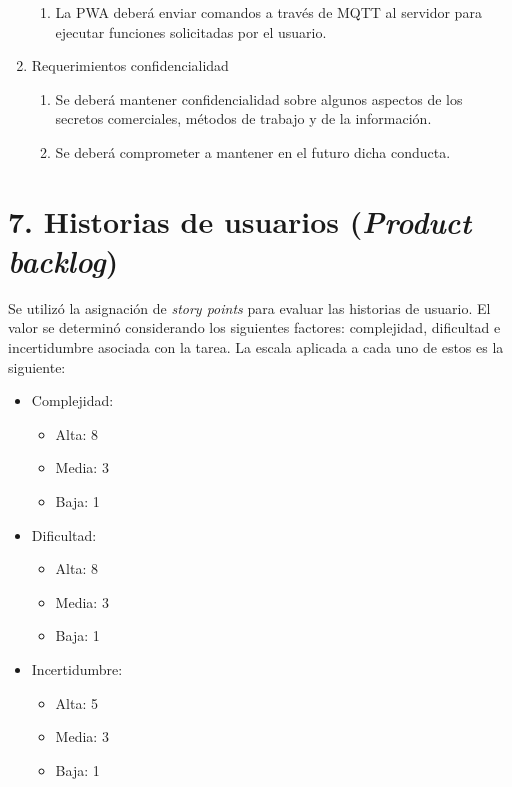 \documentclass[
11pt, %
]{charter}
\begin{document}
\begin{enumerate}
\begin{enumerate}
			\item La PWA deberá enviar comandos a través de MQTT al servidor  para ejecutar funciones solicitadas por el usuario.
		\end{enumerate}
	\item Requerimientos confidencialidad
		\begin{enumerate}
			\item Se deberá mantener confidencialidad sobre algunos aspectos de los secretos comerciales, métodos de trabajo y de la información.
			\item Se deberá comprometer a mantener en el futuro dicha conducta.
		\end{enumerate}
\end{enumerate}


\section{7. Historias de usuarios (\textit{Product backlog})}
\label{sec:backlog}


Se utilizó la asignación de \textit{story points} para evaluar las historias de usuario. El valor se determinó considerando los siguientes factores: complejidad, dificultad e incertidumbre asociada con la tarea. La escala aplicada a cada uno de estos es la siguiente:

\begin{itemize}
    \item Complejidad:
    \begin{itemize}
        \item Alta: 8
        \item Media: 3
        \item Baja: 1
    \end{itemize}
    \item Dificultad:
    \begin{itemize}
        \item Alta: 8
        \item Media: 3
        \item Baja: 1
    \end{itemize}
    \item Incertidumbre:
    \begin{itemize}
        \item Alta: 5
        \item Media: 3
        \item Baja: 1
    \end{itemize}
\end{itemize}
\end{document}
